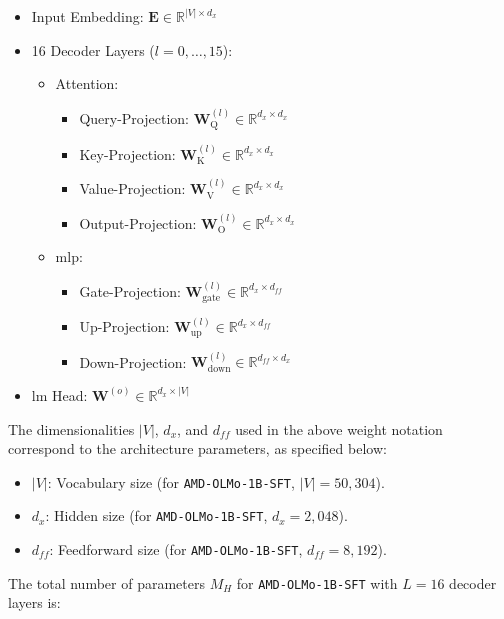 \begin{itemize}
    \item Input Embedding: $\mathbf{E} \in \mathbb{R}^{|V| \times d_x}$
    \item 16 Decoder Layers ($l = 0, \ldots, 15$):
    \begin{itemize}
        \item Attention:
        \begin{itemize}
            \item Query-Projection:   $\mathbf{W}_\text{Q}^{(l)} \in \mathbb{R}^{d_x \times d_x}$
            \item Key-Projection:     $\mathbf{W}_\text{K}^{(l)} \in \mathbb{R}^{d_x \times d_x}$
            \item Value-Projection:   $\mathbf{W}_\text{V}^{(l)} \in \mathbb{R}^{d_x \times d_x}$
            \item Output-Projection:  $\mathbf{W}_\text{O}^{(l)} \in \mathbb{R}^{d_x \times d_x}$
        \end{itemize}
        \item \acrshort{mlp}:
        \begin{itemize}
            \item Gate-Projection:    $\mathbf{W}_\text{gate}^{(l)} \in \mathbb{R}^{d_x \times d_{ff}}$
            \item Up-Projection:      $\mathbf{W}_\text{up}^{(l)} \in \mathbb{R}^{d_x \times d_{ff}}$
            \item Down-Projection:    $\mathbf{W}_\text{down}^{(l)} \in \mathbb{R}^{d_{ff} \times d_x}$
        \end{itemize}
    \end{itemize}
    \item \acrshort{lm} Head: $\mathbf{W}^{(o)} \in \mathbb{R}^{d_x \times |V|}$
\end{itemize}
The dimensionalities $|V|$, $d_x$, and $d_{ff}$ used in the above weight notation correspond to the architecture parameters, as specified below:
\begin{itemize}
    \item $|V|$: Vocabulary size (for \texttt{AMD-OLMo-1B-SFT}, $|V| = 50{,}304$).
    \item $d_x$: Hidden size (for \texttt{AMD-OLMo-1B-SFT}, $d_x = 2{,}048$).
    \item $d_{ff}$: Feedforward size (for \texttt{AMD-OLMo-1B-SFT}, $d_{ff} = 8{,}192$).
\end{itemize}
The total number of parameters $M_H$ for \texttt{AMD-OLMo-1B-SFT} with $L = 16$ decoder layers is:
